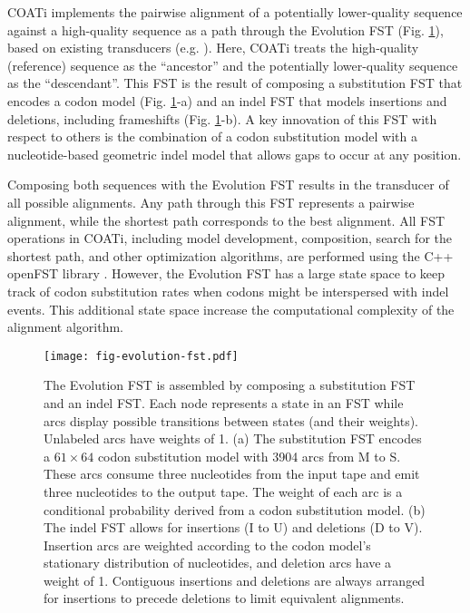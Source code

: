 COATi implements the pairwise alignment of a potentially lower-quality sequence against a high-quality sequence as a path through the Evolution FST (Fig. \ref{fig:evolution-fst}), based on existing transducers (e.g. \cite{holmes2001evolutionary}).
Here, COATi treats the high-quality (reference) sequence as the ``ancestor'' and the potentially lower-quality sequence as the ``descendant''.
This FST is the result of composing a substitution FST that encodes a codon model (Fig. \ref{fig:evolution-fst}-a) and an indel FST that models insertions and deletions, including frameshifts (Fig. \ref{fig:evolution-fst}-b).
A key innovation of this FST with respect to others is the combination of a codon substitution model with a nucleotide-based geometric indel model that allows gaps to occur at any position.

Composing both sequences with the Evolution FST results in the transducer of all possible alignments.
Any path through this FST represents a pairwise alignment, while the shortest path corresponds to the best alignment.
All FST operations in COATi, including model development, composition, search for the shortest path, and other optimization algorithms, are performed using the C++ openFST library .
However, the Evolution FST has a large state space to keep track of codon substitution rates when codons might be interspersed with indel events. This additional state space increase the computational complexity of the alignment algorithm.

\begin{figure}[h!]
\centering
\texttt{[image: fig-evolution-fst.pdf]}
\par
\caption{The Evolution FST is assembled by composing a substitution FST and an indel FST.
Each node represents a state in an FST while arcs display possible transitions between states (and their weights). Unlabeled arcs have weights of 1.
(a) The substitution FST encodes a $61 \times 64 $ codon substitution model with 3904 arcs from M to S. These arcs consume three nucleotides from the input tape and emit three nucleotides to the output tape. The weight of each arc is a conditional probability derived from a codon substitution model. 
(b) The indel FST allows for insertions (I to U) and deletions (D to V). Insertion arcs are weighted according to the codon model's stationary distribution of nucleotides, and deletion arcs have a weight of 1. Contiguous insertions and deletions are always arranged for insertions to precede deletions to limit equivalent alignments.}
\label{fig:evolution-fst}
\end{figure}


